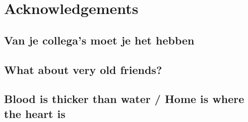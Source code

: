 
\chapter*{Acknowledgements}



\section*{Van je collega's moet je het hebben}

\section*{What about very old friends?}

\section*{Blood is thicker than water / Home is where the heart is}
